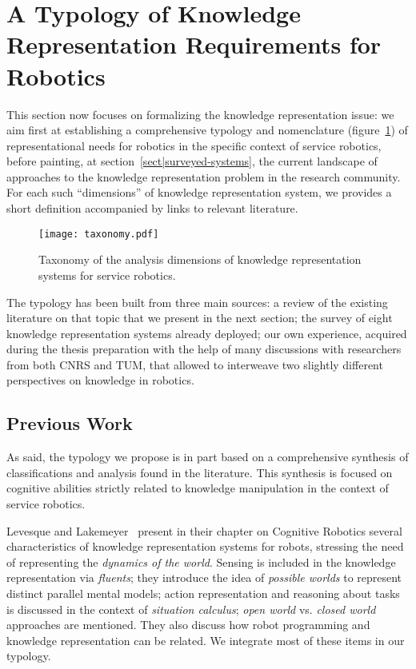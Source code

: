 \section{A Typology of Knowledge Representation Requirements for Robotics}
\label{sect|features}

This section now focuses on formalizing the knowledge representation issue: we
aim first at establishing a comprehensive typology and nomenclature
(figure~\ref{fig|taxo}) of representational needs for robotics in the specific
context of service robotics, before painting, at
section~\ref{sect|surveyed-systems}, the current landscape of approaches to the
knowledge representation problem in the research community. For each such
``dimensions'' of knowledge representation system, we provides a short
definition accompanied by links to relevant literature.

\begin{figure}
        \centering
        \texttt{[image: taxonomy.pdf]}
        \caption{Taxonomy of the analysis dimensions of knowledge
        representation systems for service robotics.}
        \label{fig|taxo}
\end{figure}

The typology has been built from three main sources: a review of the existing
literature on that topic that we present in the next section; the survey of
eight knowledge representation systems already deployed; our own experience,
acquired during the thesis preparation with the help of many discussions with
researchers from both CNRS and TUM, that allowed to interweave two slightly
different perspectives on knowledge in robotics.

\subsection{Previous Work}
\label{sect|evaluation-literature}

As said, the typology we propose is in part based on a comprehensive synthesis of
classifications and analysis found in the literature. This synthesis is focused
on cognitive abilities strictly related to knowledge manipulation in the
context of service robotics.

Levesque and Lakemeyer~\cite{Levesque2008} present in their chapter on
Cognitive Robotics several characteristics of knowledge representation systems
for robots, stressing the need of representing the \emph{dynamics of the
world}.  Sensing is included in the knowledge representation via
\emph{fluents}; they introduce the idea of \emph{possible worlds} to represent
distinct parallel mental models; action representation and reasoning about
tasks is discussed in the context of \emph{situation calculus}; \emph{open
world} vs. \emph{closed world} approaches are mentioned.  They also discuss how
robot programming and knowledge representation can be related. We integrate
most of these items in our typology.

